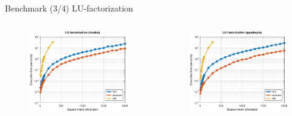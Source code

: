 \begin{frame}{Benchmark (3/4) LU-factorization}

\begin{columns}
\begin{column}{0.3\textwidth}
\begin{figure}
\centering
\includegraphics[width=1.0\linewidth]{res/data/2021-11-24_run-01-lu-double-semilogy}
\end{figure}
\end{column}
\begin{column}{0.3\textwidth}
\begin{figure}
\centering
\includegraphics[width=1.0\linewidth]{res/data/2021-11-24_run-01-lu-quadruple-semilogy}

\end{figure}
\end{column}
\end{columns}
\end{frame}
